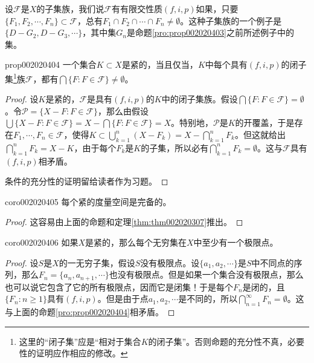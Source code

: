 设$\mathscr{F}$是$X$的子集族，我们说$\mathscr{F}$有有限交性质$(f, i, p)$如果，只要$\{F_1, F_2, \cdots, F_n\} \subset \mathscr{F}$，总有$F_1 \cap F_2 \cap \cdots \cap F_n \neq \emptyset$。这种子集族的一个例子是$\{D - G_2, D-G_3, \cdots\}$，其中集$G_n$是命题\ref{pro:prop002020403}之前所述例子中的集。

\begin{proposition}{}{prop002020404}
一个集合$K \subset X$是紧的，当且仅当，$K$中每个具有$(f,i,p)$的闭子集\footnote{这里的“闭子集”应是“相对于集合$K$的闭子集”。否则命题的充分性不真，必要性的证明应作相应的修改。}族$\mathscr{F}$，都有$\bigcap\{F: F \in \mathscr{F}\} \neq \emptyset$。
\end{proposition}

\begin{proof}
设$K$是紧的，$\mathscr{F}$是具有$(f,i,p)$的$K$中的闭子集族。假设$\bigcap\{F: F \in \mathscr{F}\} = \emptyset$。令$\mathscr{P} = \{X - F: F \in \mathscr{F}\}$，那么由假设$\bigcup\{X - F: F \in \mathscr{F}\} = X - \bigcap\{F: F \in \mathscr{F}\} = X$。特别地，$\mathscr{P}$是$K$的开覆盖，于是存在$F_1, \cdots, F_n \in \mathscr{F}$，使得$K \subset \bigcup_{k=1}^{n}{(X - F_k)} = X - \bigcap_{k=1}^{n}{F_k}$。但这就给出$\bigcap_{k=1}^{n}{F_k} = X - K$，由于每个$F_k$是$K$的子集，所以必有$\bigcap_{k=1}^{n}{F_k} = \emptyset$。这与$\mathscr{F}$具有$(f,i,p)$相矛盾。

条件的充分性的证明留给读者作为习题。
\end{proof}

\begin{corollary}{}{coro002020405}
每个紧的度量空间是完备的。
\end{corollary}

\begin{proof}
这容易由上面的命题和定理\ref{thm:thm002020307}推出。
\end{proof}

\begin{corollary}{}{coro002020406}
如果$X$是紧的，那么每个无穷集在$X$中至少有一个极限点。
\end{corollary}

\begin{proof}
设$S$是$X$的一无穷子集，假设$S$没有极限点。设$\{a_1, a_2, \cdots\}$是$S$中不同点的序列，那么$F_n = \{a_n, a_{n+1}, \cdots\}$也没有极限点。但是如果一个集合没有极限点，那么也可以说它包含了它的所有极限点，因而它是闭集！于是每个$F_n$是闭的，且$\{F_n : n \ge 1\}$具有$(f,i,p)$。但是由于点$a_1, a_2,\cdots$是不同的，所以$\bigcap_{n=1}^{\infty}{F_n} = \emptyset$。这与上面的命题\ref{pro:prop002020404}相矛盾。
\end{proof}

